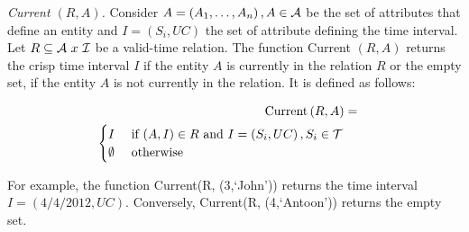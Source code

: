

\begin{definition}
\label{def:current-in-relation}
\emph{Current $\left(R, A \right)$.}
Consider $A=\left(A_1, \ldots, A_n \right), A \in \mathcal{A}$ be the set of attributes that define an entity and $I = \left(S_i, UC \right)$ the set of attribute defining the time interval. Let $R \subseteq \mathcal{A}\  x\  \mathcal{I}$ be a valid-time relation. The function Current $\left(R, A \right)$ returns the crisp time interval $I$ if the entity $A$ is currently in the relation $R$ or the empty set, if the entity $A$ is not currently in the relation. It is defined as follows:


\begin{align}
\label{eq:current-in-relation}
\mbox{Current} \left(R, A \right) &=& \\ 
\begin{cases}
\nonumber
I & \mbox{ if } (A,I) \in R \mbox{ and } I = \left(S_i, UC \right), S_i \in \mathcal{T}\\
\emptyset & \mbox{ otherwise}
\end{cases}
\end{align}
\end{definition}

For example, the function Current(R, (3,`John')) returns the time interval $I = \left(4/4/2012 , UC  \right)$. Conversely, Current(R, (4,`Antoon')) returns the empty set.


